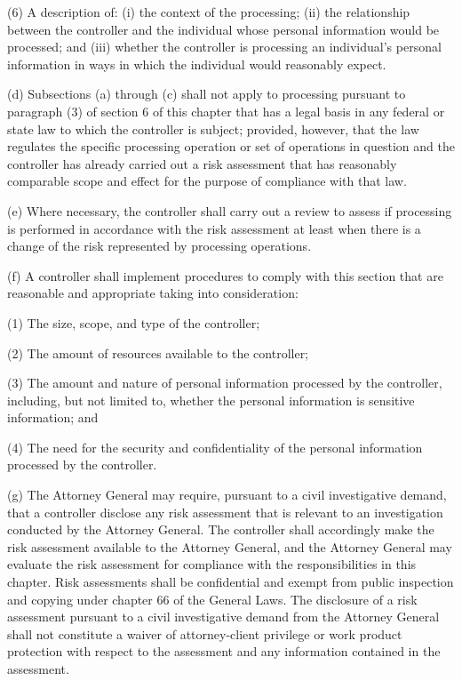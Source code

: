 (6) A description of: (i) the context of the processing; (ii) the relationship between the controller and the individual whose personal information would be processed; and (iii) whether the controller is processing an individual’s personal information in ways in which the individual would reasonably expect.

(d) Subsections (a) through (c) shall not apply to processing pursuant to paragraph (3) of section 6 of this chapter that has a legal basis in any federal or state law to which the controller is subject; provided, however, that the law regulates the specific processing operation or set of operations in question and the controller has already carried out a risk assessment that has reasonably comparable scope and effect for the purpose of compliance with that law.   

(e) Where necessary, the controller shall carry out a review to assess if processing is performed in accordance with the risk assessment at least when there is a change of the risk represented by processing operations.

(f) A controller shall implement procedures to comply with this section that are reasonable and appropriate taking into consideration:

(1) The size, scope, and type of the controller;

(2) The amount of resources available to the controller;

(3) The amount and nature of personal information processed by the controller, including, but not limited to, whether the personal information is sensitive information; and

(4) The need for the security and confidentiality of the personal information processed by the controller. 

(g) The Attorney General may require, pursuant to a civil investigative demand, that a controller disclose any risk assessment that is relevant to an investigation conducted by the Attorney General. The controller shall accordingly make the risk assessment available to the Attorney General, and the Attorney General may evaluate the risk assessment for compliance with the responsibilities in this chapter. Risk assessments shall be confidential and exempt from public inspection and copying under chapter 66 of the General Laws. The disclosure of a risk assessment pursuant to a civil investigative demand from the Attorney General shall not constitute a waiver of attorney-client privilege or work product protection with respect to the assessment and any information contained in the assessment.

